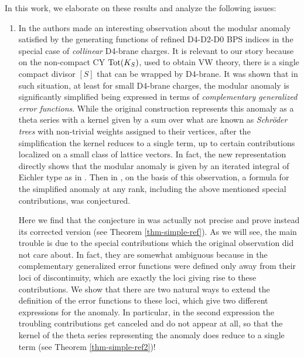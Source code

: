 \documentclass[12pt,letterpaper]{JHEP3}
\begin{document}
In this work, we elaborate on these results and analyze the following issues:

\begin{enumerate}
\item 
In \cite{Pioline:2025xgf} the authors made an interesting observation about the modular anomaly 
satisfied by the generating functions of refined D4-D2-D0 BPS indices in the special case of {\it collinear} D4-brane charges.
It is relevant to our story because 
on the non-compact CY ${\rm Tot}(K_S)$, used to obtain VW theory, 
there is a single compact divisor $[S]$ that can be wrapped by D4-brane.
It was shown that in such situation, at least for small D4-brane charges, the modular anomaly is significantly simplified 
being expressed in terms of {\it complementary generalized error functions}.
While the original construction represents this anomaly as a theta series with a kernel given by a sum over 
what are known as {\it Schr\"oder trees} with non-trivial weights assigned to their vertices, after the simplification
the kernel reduces to a single term, up to certain contributions localized on a small class of lattice vectors.
In fact, the new representation directly shows that the modular anomaly is given by an iterated integral 
of Eichler type as in \cite{Manschot:2017xcr}.
Then in \cite[Conjecture 6.1]{Alexandrov:2025sig}, on the basis of this observation,  
a formula for the simplified anomaly at any rank,
including the above mentioned special contributions, was conjectured. 
	
Here we find that the conjecture in \cite{Alexandrov:2025sig} was actually not precise
and prove instead its corrected version (see Theorem \ref{thm-simple-ref}).
As we will see, the main trouble is due to the special contributions which the original observation did not care about.
In fact, they are somewhat ambiguous because in \cite{Alexandrov:2016enp,Nazaroglu:2016lmr}
the complementary generalized error functions were defined only away from their loci of discontinuity, which 
are exactly the loci giving rise to these contributions.
We show that there are two natural ways to extend the definition of the error functions 
to these loci, which give two different expressions for the anomaly.
In particular, in the second expression the troubling contributions get canceled and do not appear at all,
so that the kernel of the theta series representing the anomaly does reduce to a single term 
(see Theorem \ref{thm-simple-ref2})!
	

\end{enumerate}
\end{document}
